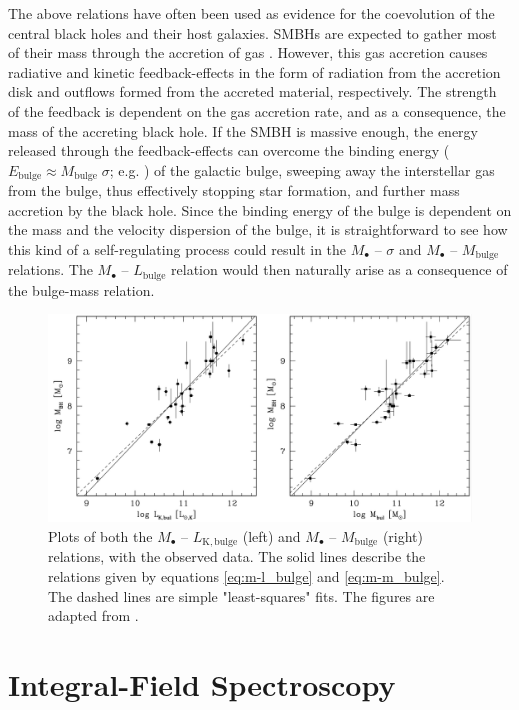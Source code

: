 \documentclass[english, oneside]{HYgradu}
\begin{document}
The above relations have often been used as evidence for the coevolution of the central black holes and their host galaxies. SMBHs are expected to gather most of their mass through the accretion of gas \citep{Soltan1982}. However, this gas accretion causes radiative and kinetic feedback-effects in the form of radiation from the accretion disk and outflows formed from the accreted material, respectively. The strength of the feedback is dependent on the gas accretion rate, and as a consequence, the mass of the accreting black hole. If the SMBH is massive enough, the energy released through the feedback-effects can overcome the binding energy ($E_\mathrm{bulge} \approx M_\mathrm{bulge} \; \sigma$; e.g. \citealt{Fabian2012}) of the galactic bulge, sweeping away the interstellar gas from the bulge, thus effectively stopping star formation, and further mass accretion by the black hole. Since the binding energy of the bulge is dependent on the mass and the velocity dispersion of the bulge, it is straightforward to see how this kind of a self-regulating process could result in the $M_\bullet$ – $\sigma$ and $M_\bullet$ – $M_\mathrm{bulge}$ relations. The $M_\bullet$ – $L_\mathrm{bulge}$ relation would then naturally arise as a consequence of the bulge-mass relation.

\begin{figure}
	\centering
	\includegraphics[width=\textwidth]{marconi_m-bul.png}
	\caption{Plots of both the $M_\bullet$ – $L_\mathrm{K,bulge}$ (left) and $M_\bullet$ – $M_\mathrm{bulge}$ (right) relations, with the observed data. The solid lines describe the relations given by equations \ref{eq:m-l_bulge} and \ref{eq:m-m_bulge}. The dashed lines are simple "least-squares" fits. The figures are adapted from \cite{Marconi2003}.}
	\label{figure:m-bulge}
\end{figure}

\section{Integral-Field Spectroscopy}
\end{document}
